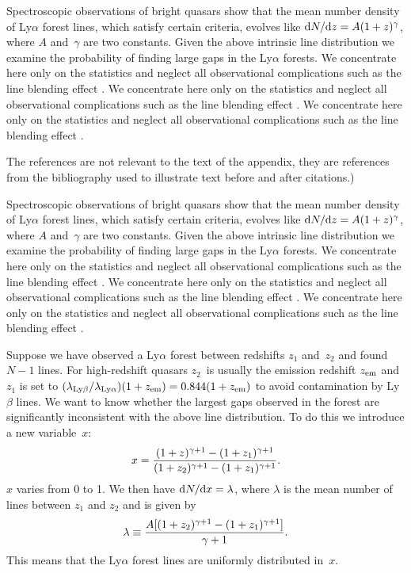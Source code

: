 \documentclass[useAMS,usenatbib]{biom}
\begin{document}
Spectroscopic observations of bright quasars show that the mean
number density of Ly$\alpha$ forest lines, which satisfy certain
criteria, evolves like ${\mathrm{d}}N/{\mathrm{d}}z=A(1+z)^\gamma$, where
$A$ and~$\gamma$ are two constants.  Given the above intrinsic
line distribution we examine the probability of finding large gaps
in the Ly$\alpha$ forests.  We concentrate here only on the
statistics and neglect all observational complications such as the
line blending effect \citep[see][for example]{b11}. We concentrate here only on the
statistics and neglect all observational complications such as the
line blending effect \citep[see][for example]{b11}. We concentrate here only on the
statistics and neglect all observational complications such as the
line blending effect \citep[see][for example]{b11}. 

The references are not relevant to the text of the
appendix, they are references from the bibliography used to
illustrate text before and after citations.)

Spectroscopic observations of bright quasars show that the mean
number density of Ly$\alpha$ forest lines, which satisfy certain
criteria, evolves like ${\mathrm{d}}N/{\mathrm{d}}z=A(1+z)^\gamma$, where
$A$ and~$\gamma$ are two constants.  Given the above intrinsic
line distribution we examine the probability of finding large gaps
in the Ly$\alpha$ forests.  We concentrate here only on the
statistics and neglect all observational complications such as the
line blending effect \citep[see][for example]{b11}. We concentrate here only on the
statistics and neglect all observational complications such as the
line blending effect \citep[see][for example]{b11}. We concentrate here only on the
statistics and neglect all observational complications such as the
line blending effect \citep[see][for example]{b11}. \vadjust{\vfill\pagebreak}

Suppose we have observed a Ly$\alpha$ forest between redshifts $z_1$
and~$z_2$ and found $N-1$ lines.  For high-redshift quasars $z_2$~is
usually the emission redshift $z_{{\mathrm{em}}}$ and $z_1$ is set to
$(\lambda_{{\mathrm{Ly}}\beta}/\lambda_{{\mathrm{Ly}}\alpha})(1+z_{{\mathrm{em}}})=0.844
(1+z_{{\mathrm{em}}})$ to avoid contamination by Ly$\beta$ lines.  We
want to know whether the largest gaps observed in the forest are
significantly inconsistent with the above line distribution.  To do
this we introduce a new variable~$x$:\vspace*{1.5pt}
%
\[
x={(1+z)^{\gamma+1}-(1+z_1)^{\gamma+1} \over
     (1+z_2)^{\gamma+1}-(1+z_1)^{\gamma+1}}.
\]
\vskip1.5pt%
$x$ varies from 0 to 1.  We then have ${\mathrm{d}}N/{\mathrm{d}}x=\lambda$,
where $\lambda$ is the mean number of lines between $z_1$ and $z_2$
and is given by
%
\[%
\lambda\equiv{A[(1+z_2)^{\gamma+1}-(1+z_1)^{\gamma+1}]\over\gamma+1}.
\]
%
This means that the Ly$\alpha$ forest lines are uniformly
distributed in~$x$.
%
\label{lastpage}
\end{document}
